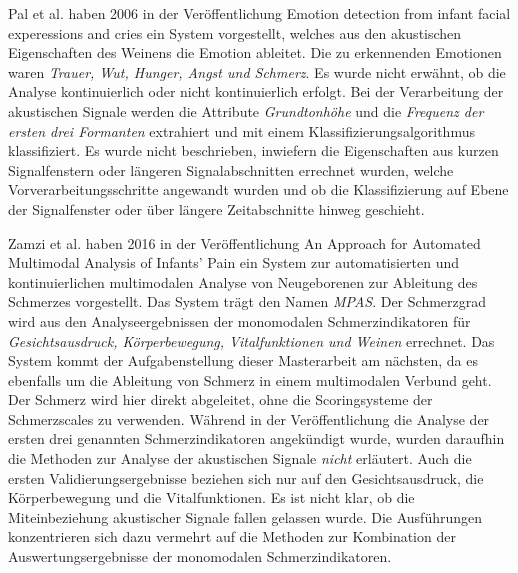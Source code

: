 
Pal et al.  haben 2006 in der Veröffentlichung \glqq Emotion detection from infant facial experessions and cries\grqq{} \cite{palEmotion} ein System vorgestellt, welches aus den akustischen Eigenschaften des Weinens die Emotion ableitet. Die zu erkennenden Emotionen waren \emph{Trauer, Wut, Hunger, Angst und Schmerz}. Es wurde nicht erwähnt, ob die Analyse kontinuierlich oder nicht kontinuierlich erfolgt. Bei der Verarbeitung der akustischen Signale werden die Attribute \emph{Grundtonhöhe} und die \emph{Frequenz der ersten drei Formanten} extrahiert und mit einem Klassifizierungsalgorithmus klassifiziert. Es wurde nicht beschrieben, inwiefern die Eigenschaften aus kurzen Signalfenstern oder längeren Signalabschnitten errechnet wurden, welche Vorverarbeitungsschritte angewandt wurden und ob die Klassifizierung auf Ebene der Signalfenster oder über längere Zeitabschnitte hinweg geschieht.

Zamzi et al.  haben 2016 in der Veröffentlichung \glqq An Approach for Automated Multimodal Analysis of Infants' Pain\grqq{} \cite{zamziMultimodal} ein System zur automatisierten und kontinuierlichen multimodalen Analyse von Neugeborenen zur Ableitung des Schmerzes vorgestellt. Das System trägt den Namen \emph{MPAS}. Der Schmerzgrad wird aus den Analyseergebnissen der monomodalen Schmerzindikatoren für \emph{Gesichtsausdruck, Körperbewegung, Vitalfunktionen und Weinen} errechnet. Das System kommt der Aufgabenstellung dieser Masterarbeit am nächsten, da es ebenfalls um die Ableitung von Schmerz in einem multimodalen Verbund geht. Der Schmerz wird hier \glqq direkt\grqq{} abgeleitet, ohne die Scoringsysteme der Schmerzscales zu verwenden. Während in der Veröffentlichung die Analyse der ersten drei genannten Schmerzindikatoren angekündigt wurde, wurden daraufhin die Methoden zur Analyse der akustischen Signale \emph{nicht} erläutert. Auch die ersten Validierungsergebnisse beziehen sich nur auf den Gesichtsausdruck, die Körperbewegung und die Vitalfunktionen. Es ist nicht klar, ob die Miteinbeziehung akustischer Signale fallen gelassen wurde. Die Ausführungen konzentrieren sich dazu vermehrt auf die Methoden zur Kombination der Auswertungsergebnisse der monomodalen Schmerzindikatoren.

